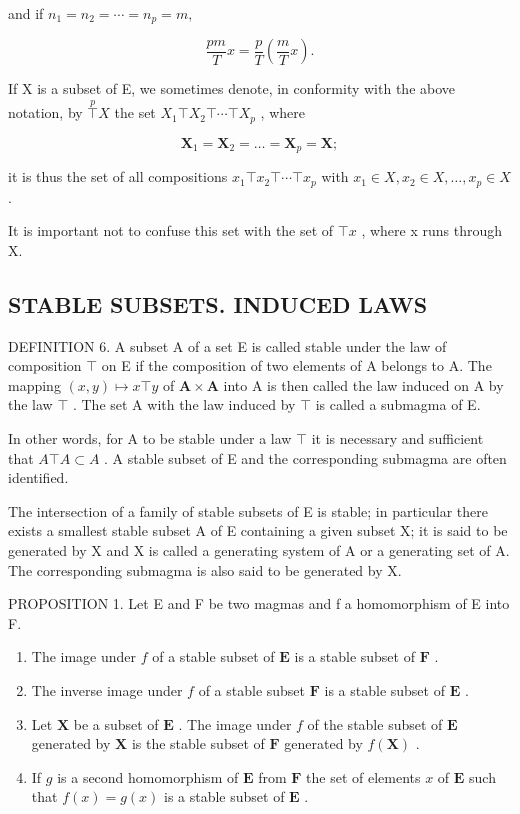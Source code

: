 and if \(n_1 = n_2 = \cdots = n_p = m,\)

\[
\frac {p m}{T} x = \frac {p}{T} \left(\frac {m}{T} x\right).\tag{5}
\]

If X is a subset of E, we sometimes denote, in conformity with the above notation, by \(\overset{p}{\top}X\) the set \(X_{1}\top X_{2}\top\cdots\top X_{p}\) , where

\[
\mathbf {X} _ {1} = \mathbf {X} _ {2} = \dots = \mathbf {X} _ {p} = \mathbf {X};
\]

it is thus the set of all compositions \(x_{1} \top x_{2} \top \cdots \top x_{p}\) with \(x_{1} \in X, x_{2} \in X, \ldots, x_{p} \in X\) .

It is important not to confuse this set with the set of \(\top x\) , where x runs through X.

\subsection{STABLE SUBSETS. INDUCED LAWS}

DEFINITION 6. A subset A of a set E is called stable under the law of composition \(\top\) on E if the composition of two elements of A belongs to A. The mapping \((x,y)\mapsto x\top y\) of \(\mathbf{A}\times \mathbf{A}\) into A is then called the law induced on A by the law \(\top\) . The set A with the law induced by \(\top\) is called a submagma of E.

In other words, for A to be stable under a law \(\top\) it is necessary and sufficient that \(A \top A \subset A\) . A stable subset of E and the corresponding submagma are often identified.

The intersection of a family of stable subsets of E is stable; in particular there exists a smallest stable subset A of E containing a given subset X; it is said to be generated by X and X is called a generating system of A or a generating set of A. The corresponding submagma is also said to be generated by X.

PROPOSITION 1. Let E and F be two magmas and f a homomorphism of E into F.

\begin{enumerate}
\def\labelenumi{(\roman{enumi})}
\item
  The image under \(f\) of a stable subset of \(\mathbf{E}\) is a stable subset of \(\mathbf{F}\) .
\item
  The inverse image under \(f\) of a stable subset \(\mathbf{F}\) is a stable subset of \(\mathbf{E}\) .
\item
  Let \(\mathbf{X}\) be a subset of \(\mathbf{E}\) . The image under \(f\) of the stable subset of \(\mathbf{E}\) generated by \(\mathbf{X}\) is the stable subset of \(\mathbf{F}\) generated by \(f(\mathbf{X})\) .
\item
  If \(g\) is a second homomorphism of \(\mathbf{E}\) from \(\mathbf{F}\) the set of elements \(x\) of \(\mathbf{E}\) such that \(f(x) = g(x)\) is a stable subset of \(\mathbf{E}\) .
\end{enumerate}

